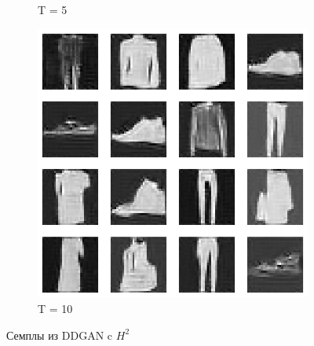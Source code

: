 \documentclass{article}
\begin{document}
\begin{figure}[H]
\begin{subfigure}[h]{0.3\linewidth}
		\caption{T = 5}
	\end{subfigure}
	\hfill
	\begin{subfigure}[h]{0.3\linewidth}
		\centering
		\includegraphics[scale=0.3]{../code/figures/generated_DDGAN_h2_10.png}
		\caption{T = 10}
	\end{subfigure}
	\caption{Семплы из DDGAN c $H^2$}\label{ddgan_h2_samples}	
\end{figure}
\end{document}
